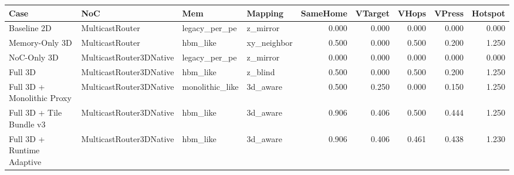 \begin{tabular}{l l l l r r r r r}
\hline
Case & NoC & Mem & Mapping & SameHome & VTarget & VHops & VPress & Hotspot \\
\hline
Baseline 2D & MulticastRouter & legacy\_per\_pe & z\_mirror & 0.000 & 0.000 & 0.000 & 0.000 & 0.000 \\
Memory-Only 3D & MulticastRouter & hbm\_like & xy\_neighbor & 0.500 & 0.000 & 0.500 & 0.200 & 1.250 \\
NoC-Only 3D & MulticastRouter3DNative & legacy\_per\_pe & z\_mirror & 0.000 & 0.000 & 0.000 & 0.000 & 0.000 \\
Full 3D & MulticastRouter3DNative & hbm\_like & z\_blind & 0.500 & 0.000 & 0.500 & 0.200 & 1.250 \\
Full 3D + Monolithic Proxy & MulticastRouter3DNative & monolithic\_like & 3d\_aware & 0.500 & 0.250 & 0.000 & 0.150 & 1.250 \\
Full 3D + Tile Bundle v3 & MulticastRouter3DNative & hbm\_like & 3d\_aware & 0.906 & 0.406 & 0.500 & 0.444 & 1.250 \\
Full 3D + Runtime Adaptive & MulticastRouter3DNative & hbm\_like & 3d\_aware & 0.906 & 0.406 & 0.461 & 0.438 & 1.230 \\
\hline
\end{tabular}

